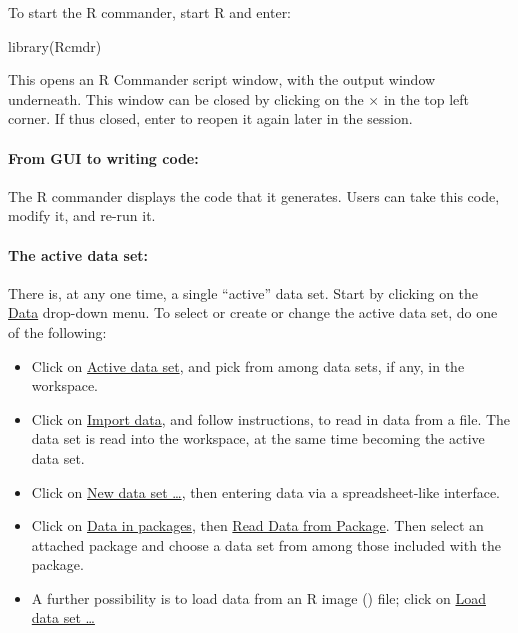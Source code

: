 






To start the R commander, start R and enter:
\begin{Schunk}
\begin{Sinput}
library(Rcmdr)
\end{Sinput}
\end{Schunk}
This opens an R Commander script window, with the output window
underneath.  
This window can be closed by clicking on the {\large
  \texttt{$\times$}} in the top left corner. If thus closed,
enter  to reopen it again later in the session.

\paragraph{From GUI to writing code:}
  The R commander
displays the code that it generates.  Users can take this code, modify
it, and re-run it.

\paragraph{The active data set:} There is, at any one time,
a single ``active'' data set. Start by clicking on the
\underline{Data} drop-down menu. To select
or create or change the active data set, do one of the following:
\begin{itemize}
\item Click on \underline{Active data set}, and pick from among data
  sets, if any, in the workspace.
\item Click on \underline{Import data}, and follow instructions, to
  read in data from a file.  The data set is read into the workspace,
  at the same time becoming the active data set.
\item Click on \underline{New data set \ldots}, then entering data via
  a spreadsheet-like interface.
\item Click on \underline{Data in packages}, then \underline{Read
    Data from Package}.  Then select an attached package and
  choose a data set from among those included with the
  package.
\item A further possibility is to load data from an R image
  () file; click on \underline{Load data set \ldots}
\end{itemize}

